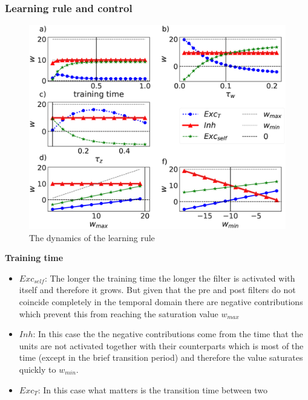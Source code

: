 \documentclass{esannV2}
\begin{document}
\subsubsection{Learning rule and control}


\begin{figure}[h!]
\centering
\includegraphics[scale=0.3]{training_rule_quantities_pre_rule_True.eps}
\caption{The dynamics of the learning rule}\label{Fig:learning_quantities_pre}
\end{figure}


\textbf{Training time}
\begin{itemize}
\item  $Exc_{self}$: The longer the training time the longer the filter is activated with itself and therefore it grows. But given that the pre and post filters do not coincide completely in the temporal domain there are negative contributions which prevent this from reaching the saturation value $w_{max}$
\item  $Inh$: In this case the the negative contributions come from the time that the units are not activated together with their counterparts which is most of the time (except in the brief transition period) and therefore the value saturates quickly to $w_{min}$.
\item $Exc_{T}$: In this case what matters is the transition time between two 
\end{itemize} 
\end{document}
